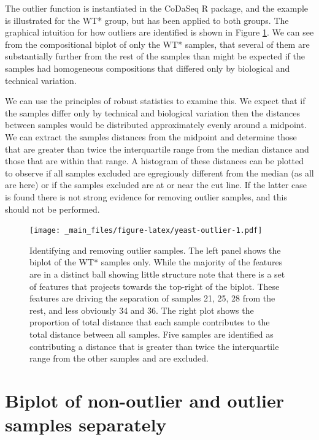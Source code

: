 \documentclass[onecolumn]{book}
\theoremstyle{definition}
\theoremstyle{definition}
\theoremstyle{definition}
\theoremstyle{remark}
\begin{document}
The outlier function is instantiated in the CoDaSeq R package, and the
example is illustrated for the WT* group, but has been applied to both
groups. The graphical intuition for how outliers are identified is shown
in Figure \ref{fig:yeast-outlier}. We can see from the compositional
biplot of only the WT* samples, that several of them are substantially
further from the rest of the samples than might be expected if the
samples had homogeneous compositions that differed only by biological
and technical variation.

We can use the principles of robust statistics to examine this. We
expect that if the samples differ only by technical and biological
variation then the distances between samples would be distributed
approximately evenly around a midpoint. We can extract the samples
distances from the midpoint and determine those that are greater than
twice the interquartile range from the median distance and those that
are within that range. A histogram of these distances can be plotted to
observe if all samples excluded are egregiously different from the
median (as all are here) or if the samples excluded are at or near the
cut line. If the latter case is found there is not strong evidence for
removing outlier samples, and this should not be performed.

\begin{figure}
\centering
\texttt{[image: \_main\_files/figure-latex/yeast-outlier-1.pdf]}
\caption{\label{fig:yeast-outlier}Identifying and removing outlier samples.
The left panel shows the biplot of the WT* samples only. While the
majority of the features are in a distinct ball showing little structure
note that there is a set of features that projects towards the top-right
of the biplot. These features are driving the separation of samples 21,
25, 28 from the rest, and less obviously 34 and 36. The right plot shows
the proportion of total distance that each sample contributes to the
total distance between all samples. Five samples are identified as
contributing a distance that is greater than twice the interquartile
range from the other samples and are excluded.}
\end{figure}

\hypertarget{biplot-of-non-outlier-and-outlier-samples-separately}{%
\section{Biplot of non-outlier and outlier samples
separately}\label{biplot-of-non-outlier-and-outlier-samples-separately}}
\end{document}
